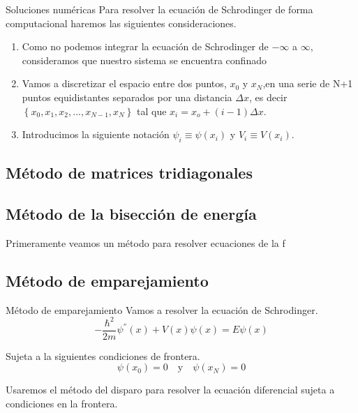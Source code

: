 \begin{frame}{Soluciones numéricas}
    Para resolver la ecuación de Schrodinger de forma computacional haremos las siguientes consideraciones.
    \begin{enumerate}
        \item Como no podemos integrar la ecuación de Schrodinger de $-\infty$ a $\infty$, consideramos que nuestro sistema se encuentra confinado 
        \item Vamos a discretizar el espacio entre dos puntos, $x_0$ y $x_N$,en una serie de N+1 puntos equidistantes separados por una distancia $\Delta x$, es decir $ \left\{ x_0, x_1, x_2, ..., x_{N-1}, x_N\right\}$ tal que $x_i = x_o + (i-1)\Delta x$. 
        \item Introducimos la siguiente notación $ \psi_i \equiv  \psi(x_i)$ y $ V_i \equiv V(x_i)$.
    \end{enumerate}
\end{frame}


\subsection{Método de matrices tridiagonales}


\subsection{Método de la bisección de energía}

\begin{frame}
    Primeramente veamos un método para resolver ecuaciones de la f
\end{frame}



\subsection{Método de emparejamiento}

\begin{frame}{Método de emparejamiento}
    Vamos a resolver la ecuación de Schrodinger.
    \begin{equation}
        -\frac{\hbar^2}{2m} \psi^{''}(x) + V(x)\psi(x) = E\psi(x) 
    \end{equation}
    
    Sujeta a la siguientes condiciones de frontera.
    \begin{equation}
        \psi(x_0) = 0
        \quad \text{y} \quad
        \psi(x_N) = 0
    \end{equation}

    Usaremos el método del disparo para resolver la ecuación diferencial sujeta a condiciones en la frontera.
\end{frame}

